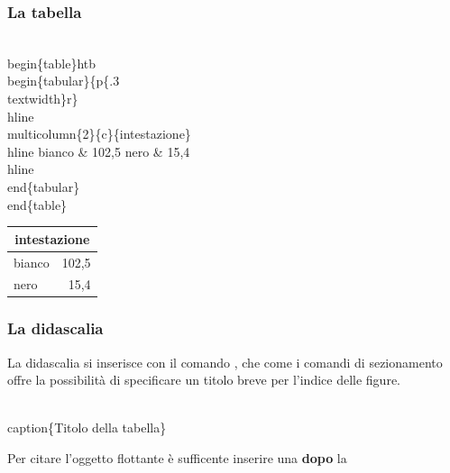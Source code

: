 \documentclass[svgnames,%
	ucs,%
	pdftex]{guitbeamer}
\begin{document}
\begin{frame}
  \frametitle{La tabella}
	\begin{LaTeXcode}
		\\begin\{table\}\alert{\tls htb\trs}\n
		\\begin\{tabular\}\{p\{.3\\textwidth\}r\}\
		\\hline \n
		\\multicolumn\{2\}\{c\}\{intestazione\}\bs\bs \
		\\hline \n
		\hspace*{5ex}bianco \& 102,5 \bs\bs\n
		\hspace*{5ex}nero   \& 15,4 \bs\bs\
		\\hline\n
		\\end\{tabular\}\n
		\\end\{table\}
	\end{LaTeXcode}
	\begin{LaTeXoutput}\centering
		\begin{tabular}{p{.3\textwidth}r}\hline
		\multicolumn{2}{c}{intestazione}\\\hline
		bianco & 102,5 \\
		nero   & 15,4 \\\hline
		\end{tabular}
	\end{LaTeXoutput}
\end{frame}
\begin{frame}
  \frametitle{La didascalia}
	La didascalia si inserisce con il comando \LCmd{caption}, che come i comandi di sezionamento offre la possibilit\`a di specificare un titolo breve per l'indice delle figure.
	\begin{LaTeXcode}
		\alert{\\caption\{}Titolo della tabella\alert{\}}
	\end{LaTeXcode}
  \medskip
 	 Per citare l'oggetto flottante \`e sufficente inserire una  \textbf{dopo} la \\
\end{frame}
\end{document}
